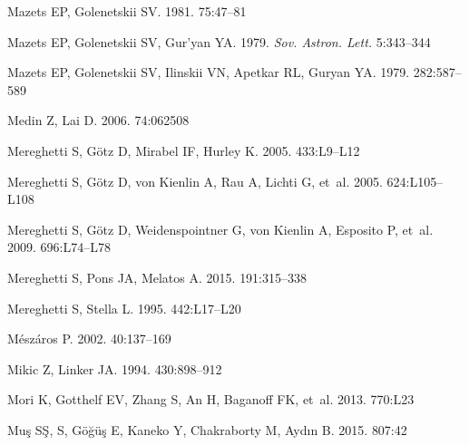 \documentclass[letterpaper]{ar-1col}
\begin{document}
\begin{thebibliography}{}
{Mazets} EP, {Golenetskii} SV. 1981.
\textit{\apss} 75:47--81

Mazets EP, Golenetskii SV, Gur'yan YA. 1979.
\textit{Sov. Astron. Lett.} 5:343--344

Mazets EP, Golenetskii SV, Ilinskii VN, Apetkar RL, Guryan YA. 1979.
\textit{\nat} 282:587--589

{Medin} Z, {Lai} D. 2006.
\textit{\pra} 74:062508

{Mereghetti} S, {G{\"o}tz} D, {Mirabel} IF, {Hurley} K. 2005{}.
\textit{\aap} 433:L9--L12

{Mereghetti} S, {G{\"o}tz} D, {von Kienlin} A, {Rau} A, {Lichti} G, et~al.
  2005{}.
\textit{\apjl} 624:L105--L108

{Mereghetti} S, {G{\"o}tz} D, {Weidenspointner} G, {von Kienlin} A, {Esposito}
  P, et~al. 2009.
\textit{\apjl} 696:L74--L78

{Mereghetti} S, {Pons} JA, {Melatos} A. 2015.
\textit{\ssr} 191:315--338

Mereghetti S, Stella L. 1995.
\textit{\apj} 442:L17--L20

{M{\'e}sz{\'a}ros} P. 2002.
\textit{\araa} 40:137--169

{Mikic} Z, {Linker} JA. 1994.
\textit{\apj} 430:898--912

{Mori} K, {Gotthelf} EV, {Zhang} S, {An} H, {Baganoff} FK, et~al. 2013.
\textit{\apjl} 770:L23

{Mu{\c s}} S{\c S}, {} S, {G{\"o}{\u g}{\"u}{\c s}} E, {Kaneko} Y,
  {Chakraborty} M, {Ayd{\i}n} B. 2015.
\textit{\apj} 807:42


\end{thebibliography}
\end{document}
